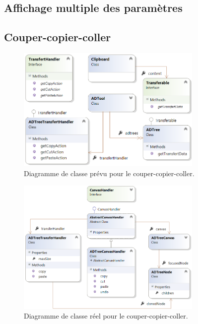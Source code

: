 	\subsection{Affichage multiple des paramètres}

	\subsection{Couper-copier-coller}
		\begin{figure}
            \centering
                \includegraphics[width=0.8\textwidth]{figure/copiercoller.png}
            \caption{Diagramme de classe prévu pour le couper-copier-coller.}
            \label{fig:copypastePrevu}
        \end{figure}
        
        \begin{figure}
            \centering
                \includegraphics[width=0.8\textwidth]{figure/copiercollerReel.png}
            \caption{Diagramme de classe réel pour le couper-copier-coller.}
            \label{fig:copypasteReel}
        \end{figure}
       
